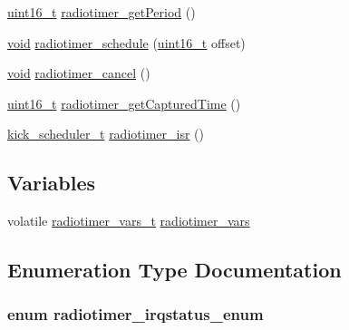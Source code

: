 \begin{DoxyCompactItemize}
\item 
\hyperlink{_p_e___types_8h_a1f1825b69244eb3ad2c7165ddc99c956}{uint16\+\_\+t} \hyperlink{group__radiotimer_ga6e96a37a1a07cb7ec7639bfb44759437}{radiotimer\+\_\+get\+Period} ()
\item 
\hyperlink{usb__devapi_8h_afabf60e7f57651d6d595a02c75f07cd0}{void} \hyperlink{iot-lab___a8-_m3_2radiotimer_8c_ab52f92ecf9d7dd4bcc893119f8cdb4ed}{radiotimer\+\_\+schedule} (\hyperlink{_p_e___types_8h_a1f1825b69244eb3ad2c7165ddc99c956}{uint16\+\_\+t} offset)
\item 
\hyperlink{usb__devapi_8h_afabf60e7f57651d6d595a02c75f07cd0}{void} \hyperlink{group__radiotimer_ga87b29bd5be3a34ea714da11d244e43f2}{radiotimer\+\_\+cancel} ()
\item 
\hyperlink{_p_e___types_8h_a1f1825b69244eb3ad2c7165ddc99c956}{uint16\+\_\+t} \hyperlink{group__radiotimer_ga3f869c34f63741cf1aa6e43321662f78}{radiotimer\+\_\+get\+Captured\+Time} ()
\item 
\hyperlink{group__board_gac9ebdcc0a4f3c8422f5f4f0fbbe0ded0}{kick\+\_\+scheduler\+\_\+t} \hyperlink{group__radiotimer_ga45ba49be562da796046e90c03fdb1433}{radiotimer\+\_\+isr} ()
\end{DoxyCompactItemize}
\subsection*{Variables}
\begin{DoxyCompactItemize}
\item 
volatile \hyperlink{structradiotimer__vars__t}{radiotimer\+\_\+vars\+\_\+t} \hyperlink{iot-lab___a8-_m3_2radiotimer_8c_adedbe6745fb701ef34c3e73605a6e343}{radiotimer\+\_\+vars}
\end{DoxyCompactItemize}


\subsection{Enumeration Type Documentation}
\subsubsection[{\texorpdfstring{radiotimer\+\_\+irqstatus\+\_\+enum}{radiotimer_irqstatus_enum}}]{\setlength{\rightskip}{0pt plus 5cm}enum {\bf radiotimer\+\_\+irqstatus\+\_\+enum}}\hypertarget{iot-lab___a8-_m3_2radiotimer_8c_a0d1e20bf6acea8d0f232765070d96471}{}\label{iot-lab___a8-_m3_2radiotimer_8c_a0d1e20bf6acea8d0f232765070d96471}


